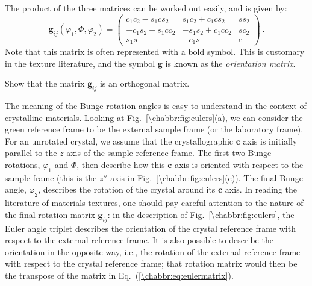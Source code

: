 The product of the three matrices can be worked out easily, and is given by:
\begin{equation}
	\mathbf{g}_{ij}(\varphi_1,\Phi,\varphi_2) = \begin{pmatrix}c_1c_2-s_1cs_2&s_1c_2+c_1cs_2&ss_2\\
	-c_1s_2-s_1cc_2&-s_1s_2+c_1cc_2&sc_2\\
	s_1s&-c_1s&c\end{pmatrix}\ .\label{\chabbr:eq:eulermatrix}
\end{equation}
Note that this matrix is often represented with a bold symbol.  This is customary in the texture literature, and the symbol $\mathbf{g}$ is known as the \textit{orientation matrix}. 

\begin{exercise}
Show that the matrix $\mathbf{g}_{ij}$ is an orthogonal matrix.
\end{exercise}

The meaning of the Bunge rotation angles is easy to understand in the context of crystalline materials.  Looking at Fig.~\ref{\chabbr:fig:eulers}(a), we can consider the green reference frame to be the external sample frame (or the laboratory frame). For an unrotated crystal, we assume that the crystallographic $\mathbf{c}$ axis is initially parallel to the $z$ axis of the sample reference frame.  The first two Bunge rotations, $\varphi_1$ and $\Phi$, then describe how this $\mathbf{c}$ axis is oriented with respect to the sample frame (this is the $z''$ axis in Fig.~\ref{\chabbr:fig:eulers}(c)).  The final Bunge angle, $\varphi_2$, describes the rotation of the crystal around its $\mathbf{c}$ axis.  In reading the literature of materials textures, one should pay careful attention to the nature of the final rotation matrix $\mathbf{g}_{ij}$: in the description of Fig.~\ref{\chabbr:fig:eulers}, the Euler angle triplet describes the orientation of the crystal reference frame with respect to the external reference frame.  It is also possible to describe the orientation in the opposite way, i.e., the rotation of the external reference frame with respect to the crystal reference frame; that rotation matrix would then be the transpose of the matrix in Eq.~(\ref{\chabbr:eq:eulermatrix}).


